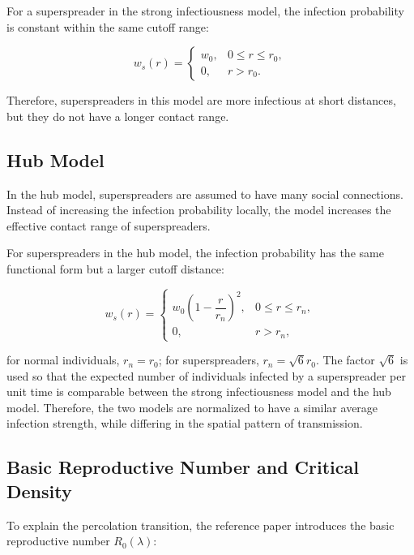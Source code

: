 \documentclass[11pt,a4paper]{article}
\begin{document}
For a superspreader in the strong infectiousness model, the infection probability is constant within the same cutoff range:

\begin{equation}
    w_s(r)=
    \begin{cases}
    w_0, & 0 \le r \le r_0,\\[0.8em]
    0, & r > r_0.
    \end{cases}
\end{equation}

Therefore, superspreaders in this model are more infectious at short distances, but they do not have a longer contact range.

\subsection{Hub Model}

In the hub model, superspreaders are assumed to have many social connections. Instead of increasing the infection probability locally, the model increases the effective contact range of superspreaders.

For superspreaders in the hub model, the infection probability has the same functional form but a larger cutoff distance:

\begin{equation}
    w_s(r)=
    \begin{cases}
    w_0\left(1-\dfrac{r}{r_n}\right)^2, & 0 \le r \le r_n,\\[0.8em]
    0, & r > r_n,
    \end{cases}
\end{equation}

for normal individuals, $r_n=r_0$; for superspreaders, $r_n=\sqrt{6}r_0$.
The factor $\sqrt{6}$ is used so that the expected number of individuals infected by a superspreader per unit time is comparable between the strong infectiousness model and the hub model. Therefore, the two models are normalized to have a similar average infection strength, while differing in the spatial pattern of transmission.

\subsection{Basic Reproductive Number and Critical Density}

To explain the percolation transition, the reference paper introduces the basic reproductive number $R_0(\lambda)$:
\end{document}
